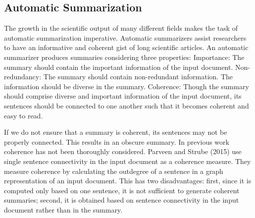 
\subsection{Automatic Summarization}
\label{subsec:automatic_summarization}

The growth in the scientific output of many different fields makes the task of automatic summarization imperative. 
Automatic summarizers assist researchers to have an informative and coherent gist of long scientific articles. 
An automatic summarizer produces summaries considering three properties: Importance: The summary should contain the important information of the input document. 
Non-redundancy: The summary should contain non-redundant information. 
The information should be diverse in the summary.
Coherence: Though the summary should comprise diverse and important information of the input document, its sentences should be connected to one another such that it becomes coherent and easy to read. 

If we do not ensure that a summary is coherent, its sentences may not be properly connected. 
This results in an obscure summary. 
In previous work coherence has not been thoroughly considered. 
Parveen and Strube (2015) use single sentence connectivity in the input document as a coherence measure. 
They measure coherence by calculating the outdegree of a sentence in a graph representation of an input document. 
This has two disadvantages: first, since it is computed only based on one sentence, it is not sufficient to generate coherent summaries; second, it is obtained based on sentence connectivity in the input document rather than in the summary. 


